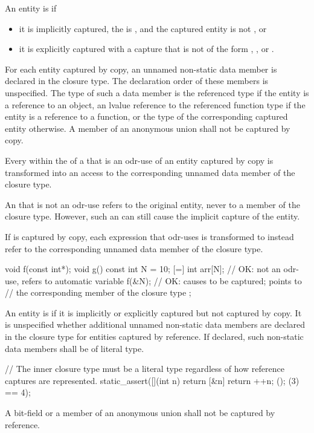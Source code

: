 \pnum
An entity is  if
\begin{itemize}
\item
it is implicitly captured,
the  is \tcode{=}, and
the captured entity is not , or
\item
it is explicitly captured with a capture that is not of the form
,
\tcode{\&} , or
\tcode{\&}  .
\end{itemize}
For each entity captured by copy, an
unnamed non-static data member is declared in the closure type. The declaration order of
these members is unspecified. The type of such a data member is
the referenced type if the entity is a reference to an object,
an lvalue reference to the referenced function type if the entity is a reference to a function, or
the type of the corresponding captured entity otherwise.
A member of an anonymous union shall not be captured by copy.

\pnum
Every  within the  of a
 that is an odr-use of an
entity captured by copy is transformed into an access to the corresponding unnamed data
member of the closure type.
\begin{note} An  that is not an odr-use refers to
the original entity, never to a member of the closure type.
However, such
an  can still cause the implicit capture of the
entity. \end{note}
If  is captured by copy, each expression that odr-uses  is
transformed to instead refer to the corresponding unnamed data member of the closure type.
\begin{example}
\begin{codeblock}
void f(const int*);
void g() {
  const int N = 10;
  [=] {
    int arr[N];     // OK: not an odr-use, refers to automatic variable
    f(&N);          // OK: causes  to be captured;  points to
                    // the corresponding member of the closure type
  };
}
\end{codeblock}
\end{example}

\pnum
An entity is  if it is implicitly or explicitly
captured but not captured by copy. It is unspecified whether additional unnamed
non-static data members are declared in the closure type for entities captured by
reference.
If declared, such non-static data members shall be of literal type.
\begin{example}
\begin{codeblock}
// The inner closure type must be a literal type regardless of how reference captures are represented.
static_assert([](int n) { return [&n] { return ++n; }(); }(3) == 4);
\end{codeblock}
\end{example}
A bit-field or a member of an anonymous union shall not be captured by reference.

